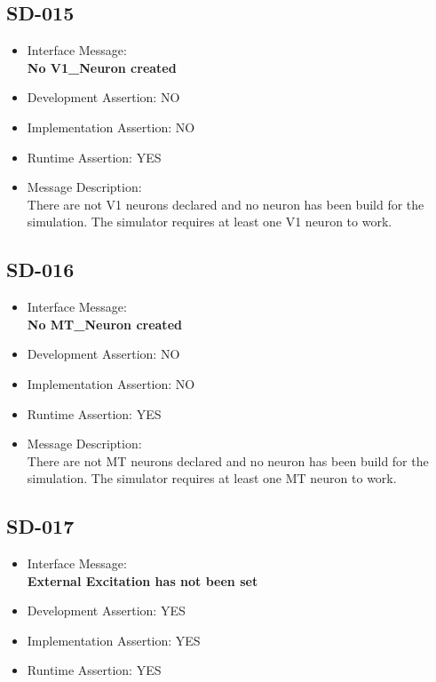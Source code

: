 \subsection{SD-015}
\begin{itemize}
  \item Interface Message:\\[1em]
    \textbf{No V1\_Neuron created}
  \item Development Assertion: NO
  \item Implementation Assertion: NO
  \item Runtime Assertion: YES
  \item Message Description:\\[1em]
    There are not V1 neurons declared and no neuron has been build for the simulation. The simulator requires at least one V1 neuron to work.
\end{itemize}

\subsection{SD-016}
\begin{itemize}
  \item Interface Message:\\[1em]
    \textbf{No MT\_Neuron created}
  \item Development Assertion: NO
  \item Implementation Assertion: NO
  \item Runtime Assertion: YES
  \item Message Description:\\[1em]
    There are not MT neurons declared and no neuron has been build for the simulation. The simulator requires at least one MT neuron to work.
\end{itemize}

\subsection{SD-017}
\begin{itemize}
  \item Interface Message:\\[1em]
    \textbf{External Excitation has not been set}
  \item Development Assertion: YES
  \item Implementation Assertion: YES
  \item Runtime Assertion: YES
\end{itemize}

